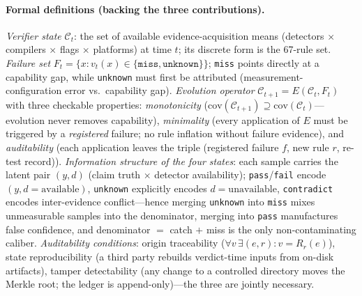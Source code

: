 \documentclass{article}
\begin{document}
\paragraph{Formal definitions (backing the three contributions).}
\emph{Verifier state} $\mathcal{C}_t$: the set of available evidence-acquisition means (detectors
$\times$ compilers $\times$ flags $\times$ platforms) at time $t$; its discrete form is the
67-rule set. \emph{Failure set} $F_t = \{x : v_t(x) \in \{\texttt{miss}, \texttt{unknown}\}\}$;
\texttt{miss} points directly at a capability gap, while \texttt{unknown} must first be attributed
(measurement-configuration error vs.\ capability gap). \emph{Evolution operator}
$\mathcal{C}_{t+1} = E(\mathcal{C}_t, F_t)$ with three checkable properties:
\emph{monotonicity} ($\mathrm{cov}(\mathcal{C}_{t+1}) \supseteq \mathrm{cov}(\mathcal{C}_t)$---
evolution never removes capability), \emph{minimality} (every application of $E$ must be triggered
by a \emph{registered} failure; no rule inflation without failure evidence), and
\emph{auditability} (each application leaves the triple (registered failure $f$, new rule $r$,
re-test record)). \emph{Information structure of the four states}: each sample carries the latent
pair $(y, d)$ (claim truth $\times$ detector availability); \texttt{pass}/\texttt{fail} encode
$(y, d{=}\text{available})$, \texttt{unknown} explicitly encodes $d{=}\text{unavailable}$,
\texttt{contradict} encodes inter-evidence conflict---hence merging \texttt{unknown} into
\texttt{miss} mixes unmeasurable samples into the denominator, merging into \texttt{pass}
manufactures false confidence, and denominator $=$ catch $+$ miss is the only non-contaminating
caliber. \emph{Auditability conditions}: origin traceability
($\forall v\, \exists (e,r): v = R_r(e)$), state reproducibility (a third party rebuilds
verdict-time inputs from on-disk artifacts), tamper detectability (any change to a controlled
directory moves the Merkle root; the ledger is append-only)---the three are jointly necessary.
\end{document}

